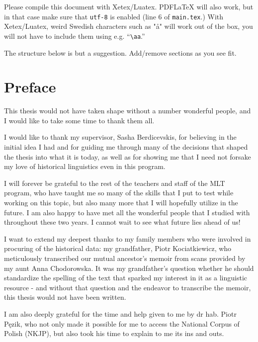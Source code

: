 \documentclass[12pt, a4paper]{article}  %
\begin{document}
Please compile this document with Xetex/Luatex. PDFLaTeX will also work, but in that case make sure that \texttt{utf-8} is enabled (line 6 of \texttt{main.tex}.) With Xetex/Luatex, weird Swedish characters such as "å" will work out of the box, you will not have to include them using e.g. ``\texttt{\textbackslash aa}.''

The structure below is but a suggestion. Add/remove sections as you see fit.

\thispagestyle{empty}

\newpage
\section*{Preface}

This thesis would not have taken shape without a number wonderful people, and I would like to take some time to thank them all.  

I would like to thank my supervisor, Sasha Berdicevskis, for believing in the initial idea I had and for guiding me through many of the decisions that shaped the thesis into what it is today, as well as for showing me that I need not forsake my love of historical linguistics even in this program.

I will forever be grateful to the rest of the teachers and staff of the MLT program, who have taught me so many of the skills that I put to test while working on this topic, but also many more that I will hopefully utilize in the future. I am also happy to have met all the wonderful people that I studied with throughout these two years. I cannot wait to see what future lies ahead of us!

I want to extend my deepest thanks to my family members who were involved in procuring of the historical data: my grandfather, Piotr Kociatkiewicz, who meticulously transcribed our mutual ancestor's memoir from scans provided by my aunt Anna Chodorowska. It was my grandfather's question whether he should standardize the spelling of the text that sparked my interest in it as a linguistic resource - and without that question and the endeavor to transcribe the memoir, this thesis would not have been written.

I am also deeply grateful for the time and help given to me by dr hab. Piotr Pęzik, who not only made it possible for me to access the National Corpus of Polish (NKJP), but also took his time to explain to me its ins and outs.
\end{document}

